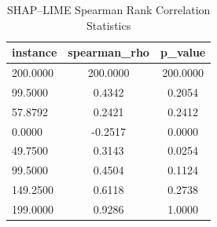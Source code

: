 \begin{table}
\centering
\caption{SHAP–LIME Spearman Rank Correlation Statistics}
\label{tab:agreement}
\begin{tabular}{lcc}
\toprule
instance & spearman_rho & p_value \\
\midrule
200.0000 & 200.0000 & 200.0000 \\
99.5000 & 0.4342 & 0.2054 \\
57.8792 & 0.2421 & 0.2412 \\
0.0000 & -0.2517 & 0.0000 \\
49.7500 & 0.3143 & 0.0254 \\
99.5000 & 0.4504 & 0.1124 \\
149.2500 & 0.6118 & 0.2738 \\
199.0000 & 0.9286 & 1.0000 \\
\bottomrule
\end{tabular}
\end{table}
